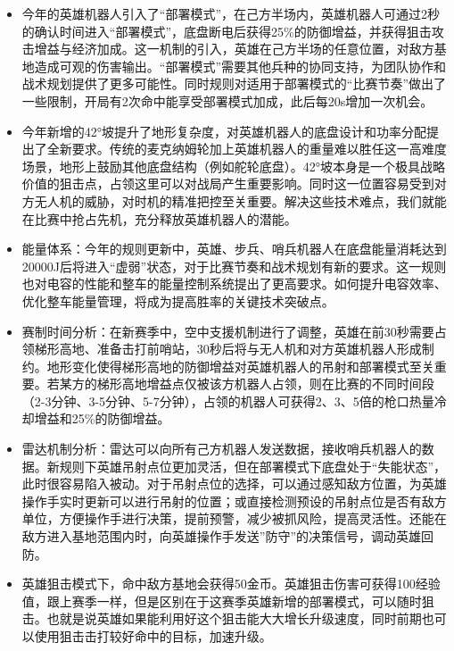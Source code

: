             \begin{itemize}
                \item 今年的英雄机器人引入了“部署模式”，在己方半场内，英雄机器人可通过2秒的确认时间进入“部署模式”，底盘断电后获得25\%的防御增益，并获得狙击攻击增益与经济加成。这一机制的引入，英雄在己方半场的任意位置，对敌方基地造成可观的伤害输出。“部署模式”需要其他兵种的协同支持，为团队协作和战术规划提供了更多可能性。同时规则对适用于部署模式的“比赛节奏”做出了一些限制，开局有2次命中能享受部署模式加成，此后每20s增加一次机会。
                
                \item 今年新增的42°坡提升了地形复杂度，对英雄机器人的底盘设计和功率分配提出了全新要求。传统的麦克纳姆轮加上英雄机器人的重量难以胜任这一高难度场景，地形上鼓励其他底盘结构（例如舵轮底盘）。42°坡本身是一个极具战略价值的狙击点，占领这里可以对战局产生重要影响。同时这一位置容易受到对方无人机的威胁，对时机的精准把控至关重要。解决这些技术难点，我们就能在比赛中抢占先机，充分释放英雄机器人的潜能。
                
                \item 能量体系：今年的规则更新中，英雄、步兵、哨兵机器人在底盘能量消耗达到20000J后将进入“虚弱”状态，对于比赛节奏和战术规划有新的要求。这一规则也对电容的性能和整车的能量控制系统提出了更高要求。如何提升电容效率、优化整车能量管理，将成为提高胜率的关键技术突破点。
                
                \item 赛制时间分析：在新赛季中，空中支援机制进行了调整，英雄在前30秒需要占领梯形高地、准备击打前哨站，30秒后将与无人机和对方英雄机器人形成制约。地形变化使得梯形高地的防御增益对英雄机器人的吊射和部署模式至关重要。若某方的梯形高地增益点仅被该方机器人占领，则在比赛的不同时间段（2-3分钟、3-5分钟、5-7分钟），占领的机器人可获得2、3、5倍的枪口热量冷却增益和25\%的防御增益。
                
                \item 雷达机制分析：雷达可以向所有己方机器人发送数据，接收哨兵机器人的数据。新规则下英雄吊射点位更加灵活，但在部署模式下底盘处于“失能状态”，此时很容易陷入被动。对于吊射点位的选择，可以通过感知敌方位置，为英雄操作手实时更新可以进行吊射的位置；或直接检测预设的吊射点位是否有敌方单位，方便操作手进行决策，提前预警，减少被抓风险，提高灵活性。还能在敌方进入基地范围内时，向英雄操作手发送”防守”的决策信号，调动英雄回防。
    
                \item 英雄狙击模式下，命中敌方基地会获得50金币。英雄狙击伤害可获得100经验值，跟上赛季一样，但是区别在于这赛季英雄新增的部署模式，可以随时狙击。也就是说英雄如果能利用好这个狙击能大大增长升级速度，同时前期也可以使用狙击击打较好命中的目标，加速升级。
    

\end{itemize}
